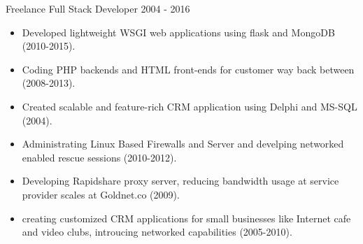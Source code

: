 \documentclass[12pt]{developercv}
\begin{document}
\begin{entrylist}
{		%
		}
	\entry
		{Freelance}
		{Full Stack Developer}
		{2004 - 2016}
		{
			\begin{itemize}
				\itemsep0em
				\item Developed lightweight WSGI web applications using flask and MongoDB (2010-2015).
				\item Coding PHP backends and HTML front-ends for customer way back between (2008-2013).
				\item Created scalable and feature-rich CRM application using Delphi and MS-SQL (2004).
				\item Administrating Linux Based Firewalls and Server and develping networked enabled rescue sessions (2010-2012).
				\item Developing Rapidshare proxy server, reducing bandwidth usage at service provider scales at Goldnet.co (2009).
				\item creating customized CRM applications for small businesses like Internet cafe and video clubs, introucing networked capabilities (2005-2010).
			\end{itemize}
		}
\end{entrylist}



%		

\end{document}
